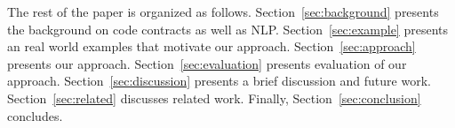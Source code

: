 %		
%		
%	
%	
%		
%
%
%
%
%


The rest of the paper is organized as follows. Section~\ref{sec:background} presents the  background on code contracts as well as NLP. Section~\ref{sec:example} presents an real world examples that motivate our approach. Section~\ref{sec:approach} presents our approach. Section~\ref{sec:evaluation} presents evaluation of our approach. Section~\ref{sec:discussion} presents a brief discussion and future work. Section~\ref{sec:related} discusses related work. Finally, Section~\ref{sec:conclusion} concludes.


